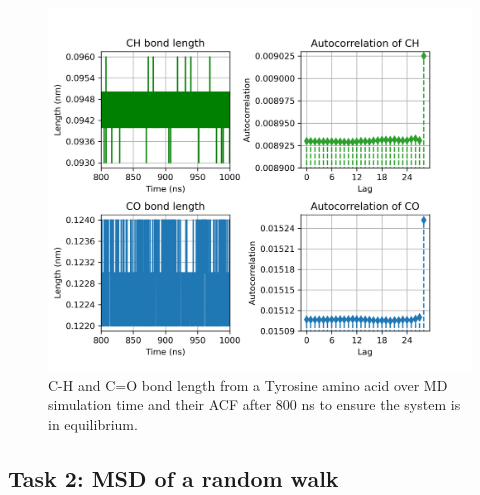 \documentclass{article}
\begin{document}
\begin{figure}[H]
\centering
\includegraphics[width=\linewidth]{CO_CH_length_acf_plot.png}
\caption{C-H and C=O bond length from a Tyrosine amino acid over MD simulation time and their ACF after 800 ns to ensure the system is in equilibrium.}
\label{fig:acf_plot}
\end{figure}

\subsection{Task 2: MSD of a random walk}
\end{document}
